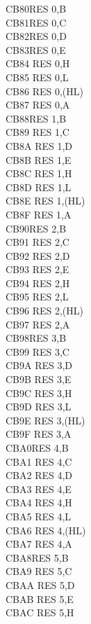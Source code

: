 \documentclass[oneside,a4paper]{book}
\begin{document}
\begin{multicols}{3}
{\begin{tabbing}
CB80\>RES 0,B\\
CB81\>RES 0,C\\
CB82\>RES 0,D\\
CB83\>RES 0,E\\
CB84\> 	RES 0,H\\
CB85\> 	RES 0,L\\
CB86\> 	RES 0,(HL)\\
CB87\> 	RES 0,A\\
CB88\>RES 1,B\\
CB89\> 	RES 1,C\\
CB8A\> 	RES 1,D\\
CB8B\> 	RES 1,E\\
CB8C\> 	RES 1,H\\
CB8D\> 	RES 1,L\\
CB8E\> 	RES 1,(HL)\\
CB8F\> 	RES 1,A\\
CB90\>RES 2,B\\
CB91\> 	RES 2,C\\
CB92\> 	RES 2,D\\
CB93\> 	RES 2,E\\
CB94\> 	RES 2,H\\
CB95\> 	RES 2,L\\
CB96\> 	RES 2,(HL)\\
CB97\> 	RES 2,A\\
CB98\>RES 3,B\\
CB99\> 	RES 3,C\\
CB9A\> 	RES 3,D\\
CB9B\> 	RES 3,E\\
CB9C\> 	RES 3,H\\
CB9D\> 	RES 3,L\\
CB9E\> 	RES 3,(HL)\\
CB9F\> 	RES 3,A\\
CBA0\>RES 4,B\\
CBA1\> 	RES 4,C\\
CBA2\> 	RES 4,D\\
CBA3\> 	RES 4,E\\
CBA4\> 	RES 4,H\\
CBA5\> 	RES 4,L\\
CBA6\> 	RES 4,(HL)\\
CBA7\> 	RES 4,A\\
CBA8\>RES 5,B\\
CBA9\> 	RES 5,C\\
CBAA\> 	RES 5,D\\
CBAB\> 	RES 5,E\\
CBAC\> 	RES 5,H\\

\end{tabbing}}
\end{multicols}
\end{document}
